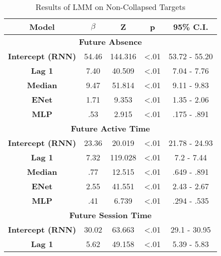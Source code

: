 \begin{table}[h]
\centering
\caption{Results of LMM on Non-Collapsed Targets}
\label{exploded_target_lmm}
\begin{tabular}{ccccc}
\hline
\textbf{Model}  & \textbf{$\beta$} & \textbf{Z} & \textbf{p} & \textbf{95\% C.I.}                  \\ \hline
\multicolumn{5}{c}{\textbf{Future Absence}}                                                                         \\ \hline
\textbf{Intercept (RNN)} & 54.46                & 144.316     & \textless .01   & 53.72 - 55.20                     \\
\textbf{Lag 1}           & 7.40                & 40.509     & \textless .01   & 7.04 - 7.76                     \\
\textbf{Median}          & 9.47                & 51.814     & \textless .01   & 9.11 - 9.83                     \\
\textbf{ENet}            & 1.71                & 9.353     & \textless .01   & 1.35 - 2.06                     \\
\textbf{MLP}             & .53                & 2.915     & \textless .01   & .175 - .891                       \\ \hline
\multicolumn{5}{c}{\textbf{Future Active Time}}                                                                     \\ \hline
\textbf{Intercept (RNN)} & 23.36                & 20.019      & \textless .01  & 21.78 - 24.93                     \\
\textbf{Lag 1}           & 7.32               & 119.028    & \textless .01  & 7.2 - 7.44                     \\
\textbf{Median}          & .77                & 12.515     & \textless .01  & .649 - .891                     \\
\textbf{ENet}            & 2.55                & 41.551     & \textless .01  & 2.43 - 2.67                     \\
\textbf{MLP}             & .41                & 6.739      & \textless .01  & .294 - .535                     \\ \hline
\multicolumn{5}{c}{\textbf{Future Session Time}}                                                                     \\ \hline
\textbf{Intercept (RNN)} & 30.02                & 63.663     & \textless .01  & 29.1 - 30.95                     \\
\textbf{Lag 1}            & 5.62                & 49.158     & \textless .01  & 5.39 - 5.83                     \\

\end{tabular}
\end{table}
